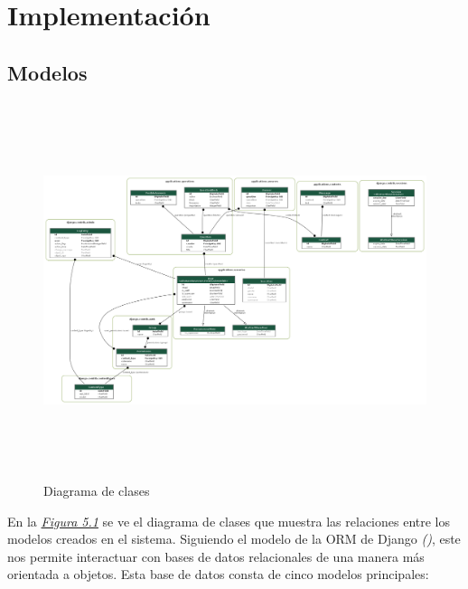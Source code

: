 \chapter{Implementación}

\section{Modelos}

\begin{figure}[!ht]
    \centering
    \includegraphics[width=1\textwidth, height=11cm]{imagenes/myapp_models.png}
    \caption{ Diagrama de clases }
    \label{fig:diagrama}
\end{figure}\vspace{1cm}


En la \textit{\hyperref[fig:diagrama]{Figura 5.1}} se ve el diagrama de clases que muestra las relaciones entre los modelos creados en el sistema. Siguiendo el modelo de la ORM de Django \textit{(\cite{djangoorm})}, este nos permite interactuar con bases de datos relacionales de una manera más orientada a objetos. Esta base de datos consta de cinco modelos principales:

